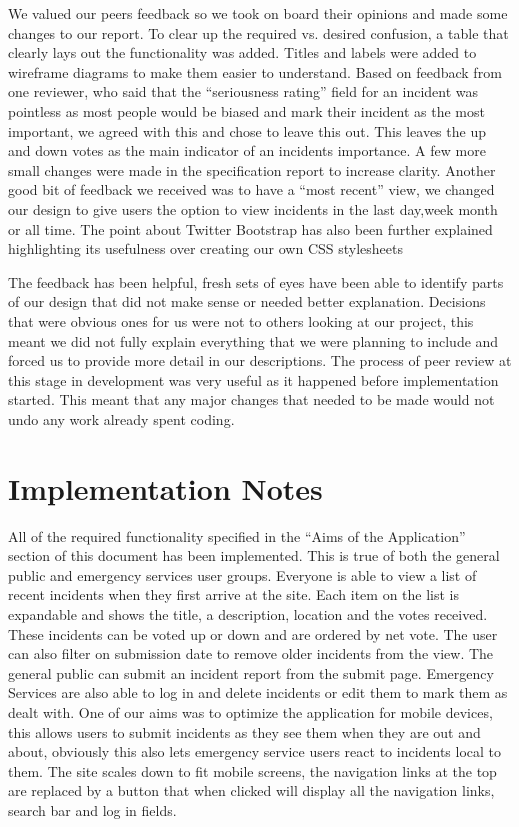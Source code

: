 \documentclass{sig-alt-release2}
\begin{document}
We valued our peers feedback so we took on board their opinions and made some changes to our report. To clear up the required vs. desired confusion, a table that clearly lays out the functionality was added. Titles and labels were added to wireframe diagrams to make them easier to understand. Based on feedback from one reviewer, who said that the ``seriousness rating'' field for an incident was pointless as most people would be biased and mark their incident as the most important, we agreed with this and chose to leave this out. This leaves the up and down votes as the main indicator of an incidents importance. A few more small changes were made in the specification report to increase clarity. Another good bit of feedback we received was to have a ``most recent'' view, we changed our design to give users the option to view incidents in the last day,week month or all time. The point about Twitter Bootstrap has also been further explained highlighting its usefulness over creating our own CSS stylesheets

The feedback has been helpful, fresh sets of eyes have been able to identify parts of our design that did not make sense or needed better explanation. Decisions that were obvious ones for us were not to others looking at our project, this meant we did not fully explain everything that we were planning to include and forced us to provide more detail in our descriptions. The process of peer review at this stage in development was very useful as it happened before implementation started. This meant that any major changes that needed to be made would not undo any work already spent coding.

\newpage
\section{Implementation Notes}
All of the required functionality specified in the ``Aims of the Application'' section of this document has been implemented. This is true of both the general public and emergency services user groups. Everyone is able to view a list of recent incidents when they first arrive at the site. Each item on the list is expandable and shows the title, a description, location and the votes received. These incidents can be voted up or down and are ordered by net vote. The user can also filter on submission date to remove older incidents from the view. The general public can submit an incident report from the submit page. Emergency Services are also able to log in and delete incidents or edit them to mark them as dealt with. One of our aims was to optimize the application for mobile devices, this allows users to submit incidents as they see them when they are out and about, obviously this also lets emergency service users react to incidents local to them. The site scales down to fit mobile screens, the navigation links at the top are replaced by a button that when clicked will display all the navigation links, search bar and log in fields.
\end{document}
